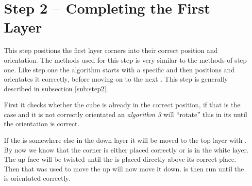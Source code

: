 \section{Step 2 -- Completing the First Layer}
This step positions the first layer corners into their correct position and orientation. The methods used for this step is very similar to the methods of step one. 
Like step one the algorithm starts with a specific \cpiece{} and then positions and orientates it correctly, before moving on to the next \cpiece. 
This step is generally described in subsection \ref{sub:step2}.

First it checks whether the cube is already in the correct position, if that is the case and it is not correctly orientated an \textit{algorithm 3} will ``rotate'' this \cpiece{} in its \cubicle{} until the orientation is correct. 

If the \cpiece{} is somewhere else in the down layer it will be moved to the top layer with . 
By now we know that the corner \cpiece{} is either placed correctly or is in the white layer. 
The up face will be twisted until the \cpiece{} is placed directly above its correct place. 
Then  that was used to move the \cpiece{} up will now move it down. 
 is then run until the \cpiece{} is orientated correctly.
